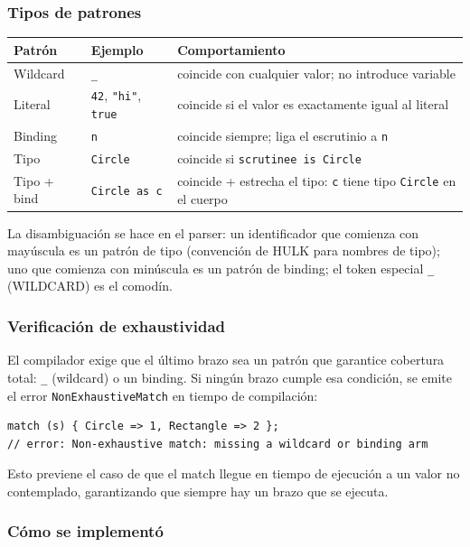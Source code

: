 \documentclass[12pt,letterpaper]{article}
\newcommand{\hulk}{\textsc{HULK}}
\newcommand{\src}[1]{\texttt{#1}}
\begin{document}
\subsubsection{Tipos de patrones}

\begin{center}
\begin{tabular}{lll}
\toprule
\textbf{Patrón} & \textbf{Ejemplo} & \textbf{Comportamiento} \\
\midrule
Wildcard & \src{\_} & coincide con cualquier valor; no introduce variable \\
Literal  & \src{42}, \src{"hi"}, \src{true} & coincide si el valor es exactamente igual al literal \\
Binding  & \src{n} & coincide siempre; liga el escrutinio a \src{n} \\
Tipo     & \src{Circle} & coincide si \src{scrutinee is Circle} \\
Tipo + bind & \src{Circle as c} & coincide + estrecha el tipo: \src{c} tiene tipo \src{Circle} en el cuerpo \\
\bottomrule
\end{tabular}
\end{center}

La disambiguación se hace en el parser: un identificador que comienza con mayúscula es un patrón de tipo (convención de \hulk{} para nombres de tipo); uno que comienza con minúscula es un patrón de binding; el token especial \src{\_} (WILDCARD) es el comodín.

\subsubsection{Verificación de exhaustividad}

El compilador exige que el último brazo sea un patrón que garantice cobertura total: \src{\_} (wildcard) o un binding. Si ningún brazo cumple esa condición, se emite el error \src{NonExhaustiveMatch} en tiempo de compilación:

\begin{lstlisting}[language=HULK,caption={Match no exhaustivo: error de compilación}]
match (s) { Circle => 1, Rectangle => 2 };
// error: Non-exhaustive match: missing a wildcard or binding arm
\end{lstlisting}

Esto previene el caso de que el match llegue en tiempo de ejecución a un valor no contemplado, garantizando que siempre hay un brazo que se ejecuta.

\subsubsection{Cómo se implementó}
\end{document}

